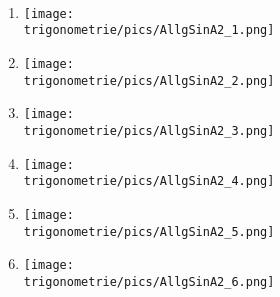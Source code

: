 \begin{Exercise}[title={Stelle jeweils die Funktionsgleichung vom Typ \(a\cdot \sin\left(bx\right)+d\)\\oder \(a\cdot \cos\left(bx\right)+d\) auf.}, label=allgSinCosA2]\\
	\begin{minipage}{\textwidth}
		\begin{minipage}{0.49\textwidth}
			\begin{enumerate}[label=\alph*)]
				\item \begin{minipage}{.9\textwidth}
					\texttt{[image: \\trigonometrie/pics/AllgSinA2\_1.png]}\\
				\end{minipage}	
				\item \begin{minipage}{.9\textwidth}
					\texttt{[image: \\trigonometrie/pics/AllgSinA2\_2.png]}\\
				\end{minipage}
				\item \begin{minipage}{.9\textwidth}
					\texttt{[image: \\trigonometrie/pics/AllgSinA2\_3.png]}\\
				\end{minipage}
				\item \begin{minipage}{.9\textwidth}
					\texttt{[image: \\trigonometrie/pics/AllgSinA2\_4.png]}\\
				\end{minipage}
				\item \begin{minipage}{.9\textwidth}
					\texttt{[image: \\trigonometrie/pics/AllgSinA2\_5.png]}\\
				\end{minipage}
			\end{enumerate}
		\end{minipage}
		\begin{minipage}{0.49\textwidth}
			\begin{enumerate}[label=\alph*)]
				\setcounter{enumi}{5}
				\item \begin{minipage}{.9\textwidth}
					\texttt{[image: \\trigonometrie/pics/AllgSinA2\_6.png]}\\
				\end{minipage}	

\end{enumerate}
\end{minipage}
\end{minipage}
\end{Exercise}
